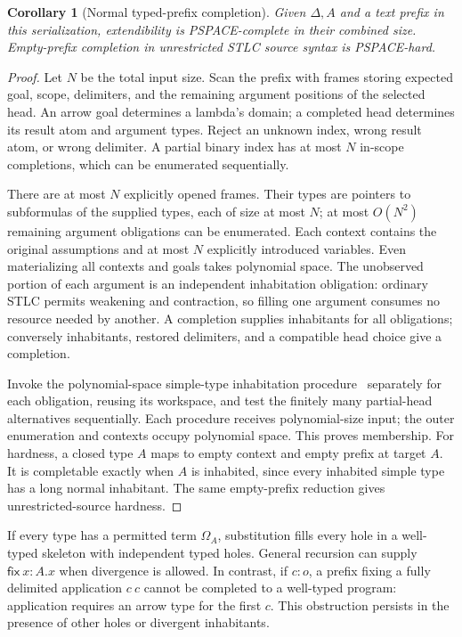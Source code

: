 \documentclass[manuscript,screen,11pt,nonacm]{acmart}
\newtheorem{corollary}[theorem]{Corollary}
\theoremstyle{definition}\newtheorem{definition}{Definition}
\begin{document}
\begin{corollary}[Normal typed-prefix completion]\label{thm:types}
Given $\Delta,A$ and a text prefix in this serialization, extendibility is PSPACE-complete in their combined size. Empty-prefix completion in unrestricted STLC source syntax is PSPACE-hard.
\end{corollary}
\begin{proof}
Let $N$ be the total input size. Scan the prefix with frames storing expected goal, scope, delimiters, and the remaining argument positions of the selected head. An arrow goal determines a lambda's domain; a completed head determines its result atom and argument types. Reject an unknown index, wrong result atom, or wrong delimiter. A partial binary index has at most $N$ in-scope completions, which can be enumerated sequentially.

There are at most $N$ explicitly opened frames. Their types are pointers to subformulas of the supplied types, each of size at most $N$; at most $O(N^2)$ remaining argument obligations can be enumerated. Each context contains the original assumptions and at most $N$ explicitly introduced variables. Even materializing all contexts and goals takes polynomial space. The unobserved portion of each argument is an independent inhabitation obligation: ordinary STLC permits weakening and contraction, so filling one argument consumes no resource needed by another. A completion supplies inhabitants for all obligations; conversely inhabitants, restored delimiters, and a compatible head choice give a completion.

Invoke the polynomial-space simple-type inhabitation procedure~\cite{Statman_1979,Švejdar2003} separately for each obligation, reusing its workspace, and test the finitely many partial-head alternatives sequentially. Each procedure receives polynomial-size input; the outer enumeration and contexts occupy polynomial space. This proves membership. For hardness, a closed type $A$ maps to empty context and empty prefix at target $A$. It is completable exactly when $A$ is inhabited, since every inhabited simple type has a long normal inhabitant. The same empty-prefix reduction gives unrestricted-source hardness.
\end{proof}

If every type has a permitted term $\Omega_A$, substitution fills every hole in a well-typed skeleton with independent typed holes. General recursion can supply $\mathsf{fix}\ x{:}A.x$ when divergence is allowed. In contrast, if $c:o$, a prefix fixing a fully delimited application $c\ c$ cannot be completed to a well-typed program: application requires an arrow type for the first $c$. This obstruction persists in the presence of other holes or divergent inhabitants.



\end{document}
